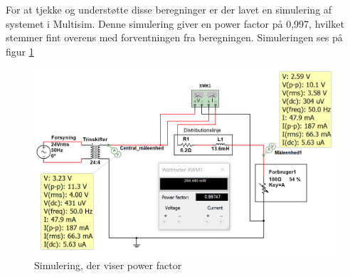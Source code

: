 For at tjekke og understøtte disse beregninger er der lavet en simulering af systemet i Multisim. Denne simulering giver en power factor på 0,997, hvilket stemmer fint overens med forventningen fra beregningen. Simuleringen ses på figur \ref{fig:powfacsim} 

\begin{figure}[H] 
	\centering
	\includegraphics[width=1\textwidth]{Figure/powerfactormultisim}
	\caption{Simulering, der viser power factor}
	\label{fig:powfacsim}
\end{figure}